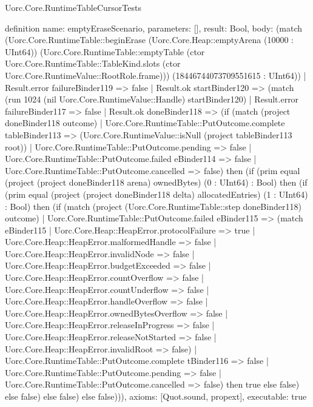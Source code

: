 \begin{lexlean}{Uorc.Core.RuntimeTableCursorTests}
\begin{semanticmodule}
definition{
  name: emptyEraseScenario,
  parameters: [],
  result: Bool,
  body: (match (Uorc.Core.RuntimeTable::beginErase (Uorc.Core.Heap::emptyArena (10000 : UInt64)) (Uorc.Core.RuntimeTable::emptyTable (ctor Uorc.Core.RuntimeTable::TableKind.slots (ctor Uorc.Core.RuntimeValue::RootRole.frame))) (18446744073709551615 : UInt64))
    | Result.error failureBinder119 => false
    | Result.ok startBinder120 => (match (run 1024 (nil Uorc.Core.RuntimeValue::Handle) startBinder120)
      | Result.error failureBinder117 => false
      | Result.ok doneBinder118 => (if (match (project doneBinder118 outcome)
        | Uorc.Core.RuntimeTable::PutOutcome.complete tableBinder113 => (Uorc.Core.RuntimeValue::isNull (project tableBinder113 root))
        | Uorc.Core.RuntimeTable::PutOutcome.pending => false
        | Uorc.Core.RuntimeTable::PutOutcome.failed eBinder114 => false
        | Uorc.Core.RuntimeTable::PutOutcome.cancelled => false) then (if (prim equal (project (project doneBinder118 arena) ownedBytes) (0 : UInt64) : Bool) then (if (prim equal (project (project doneBinder118 delta) allocatedEntries) (1 : UInt64) : Bool) then (if (match (project (Uorc.Core.RuntimeTable::step doneBinder118) outcome)
        | Uorc.Core.RuntimeTable::PutOutcome.failed eBinder115 => (match eBinder115
          | Uorc.Core.Heap::HeapError.protocolFailure => true
          | Uorc.Core.Heap::HeapError.malformedHandle => false
          | Uorc.Core.Heap::HeapError.invalidNode => false
          | Uorc.Core.Heap::HeapError.budgetExceeded => false
          | Uorc.Core.Heap::HeapError.countOverflow => false
          | Uorc.Core.Heap::HeapError.countUnderflow => false
          | Uorc.Core.Heap::HeapError.handleOverflow => false
          | Uorc.Core.Heap::HeapError.ownedBytesOverflow => false
          | Uorc.Core.Heap::HeapError.releaseInProgress => false
          | Uorc.Core.Heap::HeapError.releaseNotStarted => false
          | Uorc.Core.Heap::HeapError.invalidRoot => false)
        | Uorc.Core.RuntimeTable::PutOutcome.complete tBinder116 => false
        | Uorc.Core.RuntimeTable::PutOutcome.pending => false
        | Uorc.Core.RuntimeTable::PutOutcome.cancelled => false) then true else false) else false) else false) else false))),
  axioms: [Quot.sound, propext],
  executable: true
}


\end{semanticmodule}
\end{lexlean}
